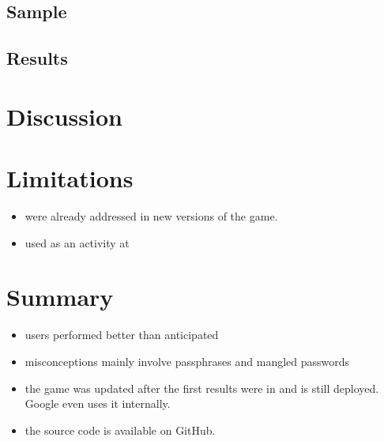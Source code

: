 \subsection{Sample}
\subsection{Results}


\section{Discussion}

\section{Limitations}
\begin{itemize}
	\item were already addressed in new versions of the game. 
	\item used as an activity at	
\end{itemize}


\section{Summary}
\begin{itemize}
	\item users performed better than anticipated
	\item misconceptions mainly involve passphrases and mangled passwords
	\item the game was updated after the first results were in and is still deployed. Google even uses it internally. 
	\item the source code is available on GitHub.
\end{itemize}